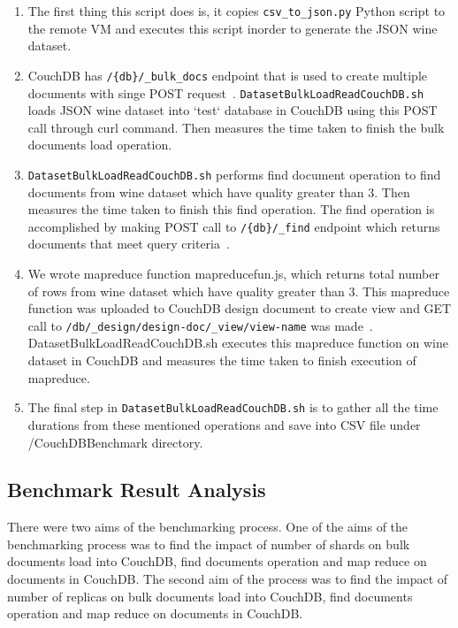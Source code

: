 \begin{enumerate}
  \item The first thing this script does is, it copies
    \verb|csv_to_json.py| Python script to the remote VM and executes
    this script inorder to generate the JSON wine dataset.
  \item CouchDB has \verb|/{db}/_bulk_docs| endpoint that is used to
    create multiple documents with singe POST
    request~\cite{www-CouchdbBulkApi}. \verb|DatasetBulkLoadReadCouchDB.sh|
    loads JSON wine dataset into `test` database in CouchDB  using 
    this POST call through curl command. Then measures the time taken
    to finish the bulk documents load operation.

  \item \verb|DatasetBulkLoadReadCouchDB.sh| performs find document operation
    to find documents from wine dataset which have quality greater
    than 3. Then measures the time taken to finish this find
    operation. The find operation is accomplished by making POST call
    to \verb|/{db}/_find| endpoint which returns documents that meet
    query criteria~\cite{www-CouchdbFind}. 

  \item We wrote mapreduce function mapreducefun.js, which returns
    total number of rows from wine dataset which have quality greater than 3. This mapreduce
    function was uploaded to CouchDB design document to create view and GET call to
    \verb|/db/_design/design-doc/_view/view-name| was
    made~\cite{www-CouchdbView}. DatasetBulkLoadReadCouchDB.sh
    executes this mapreduce function on wine dataset in CouchDB and
    measures the time taken to finish execution of mapreduce.
  \item The final step in \verb|DatasetBulkLoadReadCouchDB.sh| is to gather
    all the time durations from these mentioned operations and save
    into CSV file under /CouchDBBenchmark directory.

\end{enumerate}

\subsection{Benchmark Result Analysis}
There were two aims of the benchmarking process. One
of the aims of the benchmarking process was to find the impact of
number of shards on bulk documents load into CouchDB, find documents
operation and map reduce on documents in CouchDB. The second aim of
the process was to find the impact of number of replicas on bulk
documents load into CouchDB, find documents operation and map reduce
on documents in CouchDB. 

